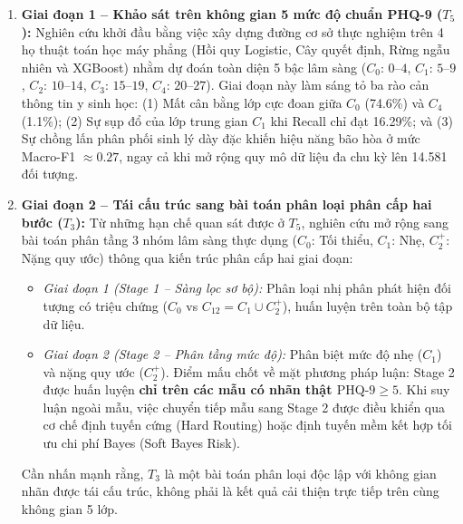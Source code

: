 \begin{enumerate}
    \item \textbf{Giai đoạn 1 -- Khảo sát trên không gian 5 mức độ chuẩn PHQ-9 ($T_5$):} 
    Nghiên cứu khởi đầu bằng việc xây dựng đường cơ sở thực nghiệm trên 4 họ thuật toán học máy phẳng (Hồi quy Logistic, Cây quyết định, Rừng ngẫu nhiên và XGBoost) nhằm dự đoán toàn diện 5 bậc lâm sàng ($C_0$: $0$--$4$, $C_1$: $5$--$9$, $C_2$: $10$--$14$, $C_3$: $15$--$19$, $C_4$: $20$--$27$). Giai đoạn này làm sáng tỏ ba rào cản thông tin y sinh học: (1) Mất cân bằng lớp cực đoan giữa $C_0$ (74.6\%) và $C_4$ (1.1\%); (2) Sự sụp đổ của lớp trung gian $C_1$ khi Recall chỉ đạt 16.29\%; và (3) Sự chồng lấn phân phối sinh lý dày đặc khiến hiệu năng bão hòa ở mức Macro-F1 $\approx 0.27$, ngay cả khi mở rộng quy mô dữ liệu đa chu kỳ lên 14.581 đối tượng.
    \item \textbf{Giai đoạn 2 -- Tái cấu trúc sang bài toán phân loại phân cấp hai bước ($T_3$):} 
    Từ những hạn chế quan sát được ở $T_5$, nghiên cứu mở rộng sang bài toán phân tầng 3 nhóm lâm sàng thực dụng ($C_0$: Tối thiểu, $C_1$: Nhẹ, $C_2^+$: Nặng quy ước) thông qua kiến trúc phân cấp hai giai đoạn:
    \begin{itemize}
        \item \textit{Giai đoạn 1 (Stage 1 -- Sàng lọc sơ bộ):} Phân loại nhị phân phát hiện đối tượng có triệu chứng ($C_0$ vs $C_{12} = C_1 \cup C_2^+$), huấn luyện trên toàn bộ tập dữ liệu.
        \item \textit{Giai đoạn 2 (Stage 2 -- Phân tầng mức độ):} Phân biệt mức độ nhẹ ($C_1$) và nặng quy ước ($C_2^+$). Điểm mấu chốt về mặt phương pháp luận: Stage 2 được huấn luyện \textbf{chỉ trên các mẫu có nhãn thật $\text{PHQ-9} \ge 5$}. Khi suy luận ngoài mẫu, việc chuyển tiếp mẫu sang Stage 2 được điều khiển qua cơ chế định tuyến cứng (Hard Routing) hoặc định tuyến mềm kết hợp tối ưu chi phí Bayes (Soft Bayes Risk).
    \end{itemize}
    Cần nhấn mạnh rằng, $T_3$ là một bài toán phân loại độc lập với không gian nhãn được tái cấu trúc, không phải là kết quả cải thiện trực tiếp trên cùng không gian 5 lớp.
\end{enumerate}

